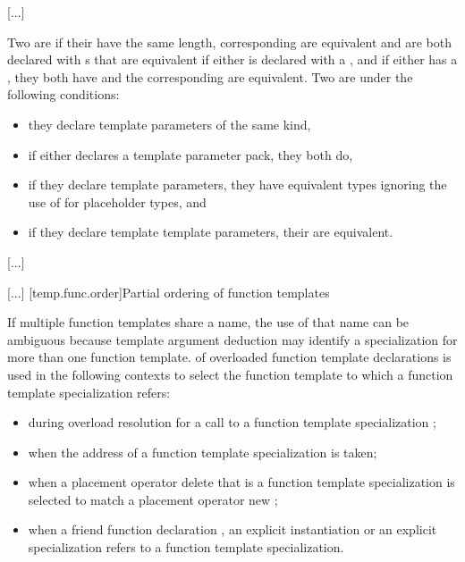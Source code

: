 \documentclass{wg21}
\begin{document}
\textcolor{noteclr}{[...]}

\pnum
Two  are
 if
their  have the same length,
corresponding  are equivalent
and are both declared with s that are equivalent
if either 
is declared with a ,
and if either  has a ,
they both have
 and the corresponding
 are equivalent.
Two  are
under the following conditions:
\begin{itemize}
    \item they declare template parameters of the same kind,
    \item if either declares a template parameter pack, they both do,
    \item if they declare  template parameters,
    they have equivalent types
    ignoring the use of  for placeholder types, and
    \item if they declare template template parameters, their  are equivalent.
\end{itemize}
\textcolor{noteclr}{[...]}

\textcolor{noteclr}{[...]}
[temp.func.order]{Partial ordering of function templates}

\pnum
{}%
%
If multiple function templates share a name,
the use of that name can be ambiguous because
template argument deduction  may identify
a specialization for more than one function template.
of overloaded function template declarations is used in the following contexts
to select the function template to which a function template specialization
refers:
\begin{itemize}
    \item
    during overload resolution for a call to a function template specialization ;
    \item
    when the address of a function template specialization is taken;
    \item
    when a placement operator delete that is a
    function template
    specialization
    is selected to match a placement operator new
    ;
    \item
    when a friend function declaration , an
    explicit instantiation  or an explicit specialization  refers to
    a function template specialization.
\end{itemize}
\end{document}
